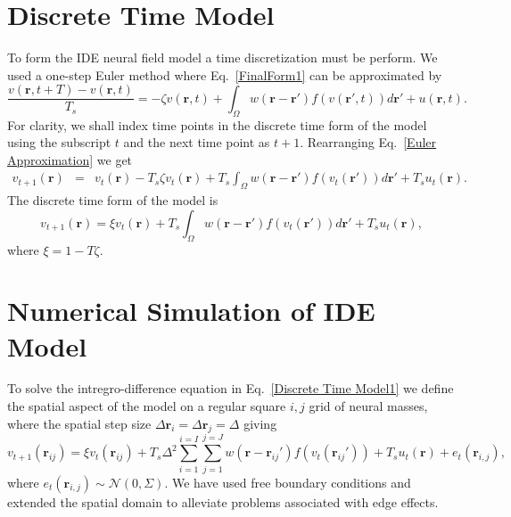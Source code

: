 \documentclass[12pt]{iopart}		%
\begin{document}
\section{Discrete Time Model}\label{Time Discretization}
To form the IDE neural field model a time discretization must be perform. We used a one-step Euler method where Eq.~\ref{FinalForm1} can be approximated by
\begin{equation}\label{Euler Approximation}	
\frac{v\left( \mathbf{r},t+T \right) - v\left( \mathbf{r},t\right)}{T_s} =   -\zeta v\left( \mathbf{r},t \right) + \int_\Omega  {w\left( \mathbf{r}-\mathbf{r}' \right)f\left( {v\left( \mathbf{r}',t \right)} \right)d\mathbf{r}'} + u\left(\mathbf{r},t\right).
\end{equation}
For clarity, we shall index time points in the discrete time form of the model using the subscript $t$ and the next time point as $t+1$. Rearranging Eq.~\ref{Euler Approximation} we get
\begin{eqnarray}\label{Euler Approximation}	
v_{t+1}\left( \mathbf{r}\right) &=& v_t\left( \mathbf{r}\right) -T_s \zeta v_t\left( \mathbf{r}\right) + T_s \int_\Omega  {w\left( \mathbf{r}-\mathbf{r}' \right)f\left( {v_t\left( \mathbf{r}'\right)} \right)d\mathbf{r}'} + T_s u_t\left(\mathbf{r}\right).
\end{eqnarray}
The discrete time form of the model is
\begin{equation}\label{Discrete Time Model1}
	v_{t+1}\left(\mathbf{r}\right) = \xi v_t\left(\mathbf{r}\right) + T_s \int_\Omega { w\left(\mathbf{r}-\mathbf{r}'\right) f\left(v_t\left(\mathbf{r}'\right)\right) d\mathbf{r}'} + T_s u_t\left(\mathbf{r}\right),
\end{equation}
where $\xi = 1 - T \zeta$.
 \section{Numerical Simulation of IDE Model}\label{Space Discretization}
To solve the intregro-difference equation in Eq.~\ref{Discrete Time Model1} we define the spatial aspect of the model on a regular square $i,j$ grid of neural masses, where the spatial step size $\Delta \mathbf{r}_i = \Delta \mathbf{r}_j = \Delta $ giving
\begin{equation}\label{discrete space}
	v_{t+1}\left(\mathbf{r}_{ij}\right) = \xi v_t\left(\mathbf{r}_{ij}\right) + T_s \Delta^2 \sum_{i=1}^{i=I}{ \sum_{j=1}^{j=J}{ w\left( \mathbf{r}-\mathbf{r}_{ij}' \right)f\left( v_t\left( \mathbf{r}_{ij}'\right) \right)} } + T_s u_t\left(\mathbf{r}\right) + e_t(\mathbf{r}_{i,j}),
\end{equation}
where $e_t(\mathbf{r}_{i,j}) \sim \mathcal{N}\left(0,\Sigma\right)$.
We have used free boundary conditions and extended the spatial domain to alleviate problems associated with edge effects.
\end{document}
